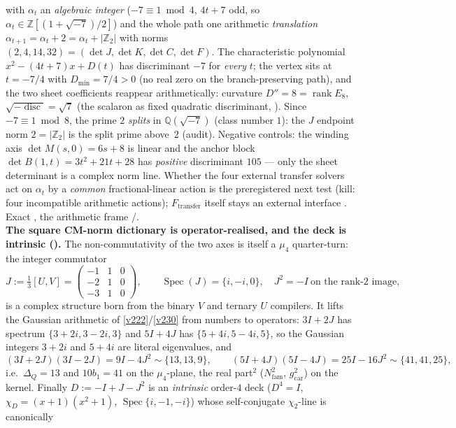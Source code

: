 \documentclass[11pt,a4paper]{article}
\newcommand{\gcar}{g_{\mathrm{car}}}
\newcommand{\Nfam}{N_{\mathrm{fam}}}
\newcommand{\Z}{\mathbb{Z}}
\theoremstyle{definition}
\begin{document}
\begin{keybox}
with $\alpha_t$ an \emph{algebraic integer} ($-7\equiv1\bmod4$, $4t{+}7$ odd, so
$\alpha_t\in\Z[(1{+}\sqrt{-7})/2]$) and the whole path one arithmetic \emph{translation}
$\alpha_{t+1}=\alpha_t+2=\alpha_t+|\Z_2|$ with norms $(2,4,14,32)=(\det J,\det K,\det C,\det F)$. The
characteristic polynomial $x^2-(4t{+}7)x+D(t)$ has discriminant $-7$ for \emph{every} $t$; the vertex sits
at $t=-7/4$ with $D_{\min}=7/4>0$ (no real zero on the branch-preserving path), and the two sheet
coefficients reappear arithmetically: curvature $D''=8=\operatorname{rank}E_8$, $\sqrt{-\operatorname{disc}}
=\sqrt7$ (the scalaron as fixed quadratic discriminant, \mC). Since $-7\equiv1\bmod 8$, the prime $2$
\emph{splits} in $\mathbb Q(\sqrt{-7})$ (class number $1$): the $J$ endpoint norm $2=|\Z_2|$ is the split prime
above~$2$ (audit). Negative controls: the winding axis $\det M(s,0)=6s{+}8$ is linear and the anchor block
$\det B(1,t)=3t^2{+}21t{+}28$ has \emph{positive} discriminant $105$ --- only the sheet determinant is a
complex norm line. Whether the four external transfer solvers act on $\alpha_t$ by a \emph{common}
fractional-linear action is the preregistered next test (kill: four incompatible arithmetic actions);
$F_{\mathrm{transfer}}$ itself stays an external interface \mO. Exact \mE, the arithmetic frame \mC/\mO.
\smallskip\\
\noindent\textbf{The square CM-norm dictionary is operator-realised, and the deck is intrinsic
().} The non-commutativity of the two axes is itself a $\mu_4$
quarter-turn: the integer commutator
\[
  J:=\tfrac13[U,V]=\begin{pmatrix}-1&1&0\\-2&1&0\\-3&1&0\end{pmatrix},\qquad
  \operatorname{Spec}(J)=\{i,-i,0\},\quad J^2=-I\ \text{on the rank-2 image},
\]
is a complex structure born from the binary $V$ and ternary $U$ compilers. It lifts the Gaussian
arithmetic of \vref{v222}/\vref{v230} from numbers to operators: $3I{+}2J$ has spectrum
$\{3{+}2i,3{-}2i,3\}$ and $5I{+}4J$ has $\{5{+}4i,5{-}4i,5\}$, so the Gaussian integers $3{+}2i$ and
$5{+}4i$ are literal eigenvalues, and
\[
  (3I{+}2J)(3I{-}2J)=9I-4J^2\sim\{13,13,9\},\qquad (5I{+}4J)(5I{-}4J)=25I-16J^2\sim\{41,41,25\},
\]
i.e.\ $\Delta_Q=13$ and $10b_1=41$ on the $\mu_4$-plane, the real part$^2$ ($\Nfam^2$, $\gcar^2$) on the
kernel. Finally $D:=-I+J-J^2$ is an \emph{intrinsic} order-$4$ deck ($D^4=I$, $\chi_D=(x{+}1)(x^2{+}1)$,
$\operatorname{Spec}\{i,-1,-i\}$) whose self-conjugate $\chi_2$-line is canonically

\end{keybox}
\end{document}
